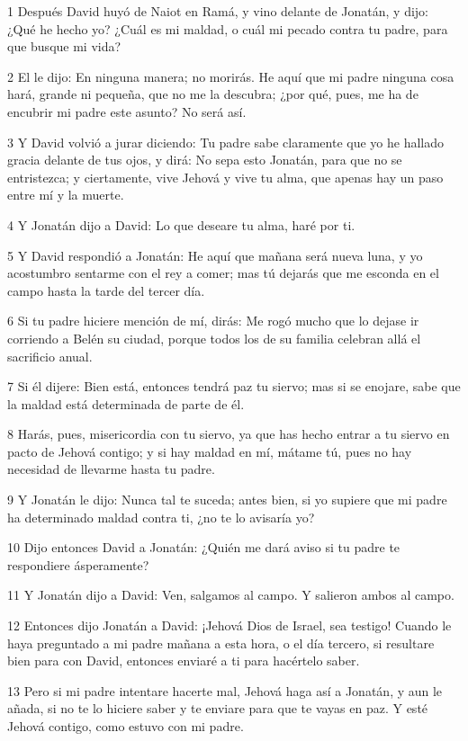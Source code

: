 \par 1 Después David huyó de Naiot en Ramá, y vino delante de Jonatán, y dijo: ¿Qué he hecho yo? ¿Cuál es mi maldad, o cuál mi pecado contra tu padre, para que busque mi vida?
\par 2 El le dijo: En ninguna manera; no morirás. He aquí que mi padre ninguna cosa hará, grande ni pequeña, que no me la descubra; ¿por qué, pues, me ha de encubrir mi padre este asunto? No será así.
\par 3 Y David volvió a jurar diciendo: Tu padre sabe claramente que yo he hallado gracia delante de tus ojos, y dirá: No sepa esto Jonatán, para que no se entristezca; y ciertamente, vive Jehová y vive tu alma, que apenas hay un paso entre mí y la muerte.
\par 4 Y Jonatán dijo a David: Lo que deseare tu alma, haré por ti.
\par 5 Y David respondió a Jonatán: He aquí que mañana será nueva luna, y yo acostumbro sentarme con el rey a comer; mas tú dejarás que me esconda en el campo hasta la tarde del tercer día.
\par 6 Si tu padre hiciere mención de mí, dirás: Me rogó mucho que lo dejase ir corriendo a Belén su ciudad, porque todos los de su familia celebran allá el sacrificio anual.
\par 7 Si él dijere: Bien está, entonces tendrá paz tu siervo; mas si se enojare, sabe que la maldad está determinada de parte de él.
\par 8 Harás, pues, misericordia con tu siervo, ya que has hecho entrar a tu siervo en pacto de Jehová contigo; y si hay maldad en mí, mátame tú, pues no hay necesidad de llevarme hasta tu padre.
\par 9 Y Jonatán le dijo: Nunca tal te suceda; antes bien, si yo supiere que mi padre ha determinado maldad contra ti, ¿no te lo avisaría yo?
\par 10 Dijo entonces David a Jonatán: ¿Quién me dará aviso si tu padre te respondiere ásperamente?
\par 11 Y Jonatán dijo a David: Ven, salgamos al campo. Y salieron ambos al campo.
\par 12 Entonces dijo Jonatán a David: ¡Jehová Dios de Israel, sea testigo! Cuando le haya preguntado a mi padre mañana a esta hora, o el día tercero, si resultare bien para con David, entonces enviaré a ti para hacértelo saber.
\par 13 Pero si mi padre intentare hacerte mal, Jehová haga así a Jonatán, y aun le añada, si no te lo hiciere saber y te enviare para que te vayas en paz. Y esté Jehová contigo, como estuvo con mi padre.
